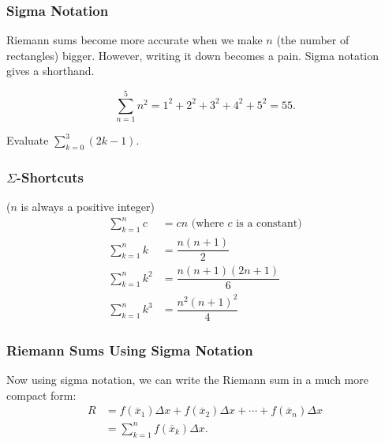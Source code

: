 \documentclass[14pt]{beamer}
\newcommand{\dsum}{\displaystyle\sum}
\begin{document}
\begin{frame}
\frametitle{\small Sigma Notation}
\footnotesize
Riemann sums become more accurate when we make $n$ (the number of rectangles) bigger.  However, writing it down becomes a pain.  Sigma notation gives a shorthand.  

\begin{ex} \[\dsum_{n=1}^5 n^2 = 1^2+2^2+3^2+4^2+5^2=55.\] \end{ex}

\begin{exe} Evaluate $\displaystyle\sum_{k=0}^3 (2k-1)$. \end{exe}
\end{frame}

\begin{frame}
\frametitle{\small $\Sigma$-Shortcuts}
\footnotesize
($n$ is always a positive integer)
\begin{align*}
\dsum_{k=1}^n c & = cn \text{ (where $c$ is a constant)} \\[0.5pc]
\dsum_{k=1}^n k &= \dfrac{n(n+1)}{2} \\[0.5pc]
\dsum_{k=1}^n k^2 &= \dfrac{n(n+1)(2n+1)}{6} \\[0.5pc]
\dsum_{k=1}^n k^3 &= \dfrac{n^2(n+1)^2}{4}
\end{align*}
\end{frame}

\begin{frame}
\frametitle{\small Riemann Sums Using Sigma Notation}
\small
Now using sigma notation, we can write the Riemann sum in a much more compact form:
\begin{align*}
R &= f(\overline{x}_1)\Delta x + f(\overline{x}_2)\Delta x + \cdots + f(\overline{x}_n)\Delta x \\[0.5pc]
 &= \dsum_{k=1}^n f(\overline{x}_k) \Delta x.
 \end{align*}

\end{frame}
\end{document}
